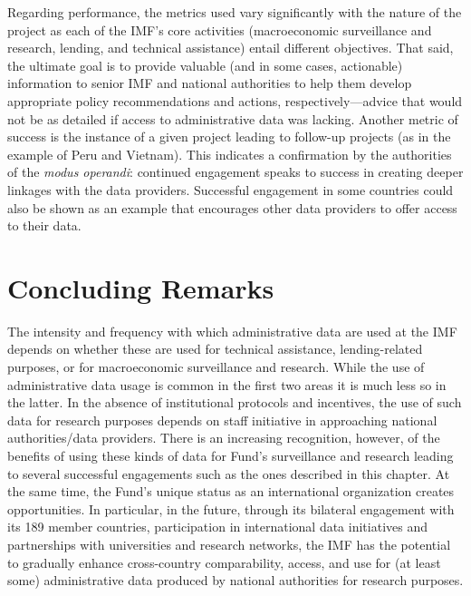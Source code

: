 Regarding performance, the metrics used vary significantly with the nature of the project as each of the IMF's core activities (macroeconomic surveillance and research, lending, and technical assistance) entail different objectives. That said, the ultimate goal is to provide valuable (and in some cases, actionable) information to senior IMF and national authorities to help them develop appropriate policy recommendations and actions, respectively---advice that would not be as detailed if access to administrative data was lacking. Another metric of success is the instance of a given project leading to follow-up projects (as in the example of Peru and Vietnam). This indicates a confirmation by the authorities of the \emph{modus operandi}: continued engagement speaks to success in creating deeper linkages with the data providers. Successful engagement in some countries could also be shown as an example that encourages other data providers to offer access to their data.

\hypertarget{concluding-remarks-4}{%
\section{Concluding Remarks}\label{concluding-remarks-4}}

The intensity and frequency with which administrative data are used at the IMF depends on whether these are used for technical assistance, lending-related purposes, or for macroeconomic surveillance and research. While the use of administrative data usage is common in the first two areas it is much less so in the latter. In the absence of institutional protocols and incentives, the use of such data for research purposes depends on staff initiative in approaching national authorities/data providers. There is an increasing recognition, however, of the benefits of using these kinds of data for Fund's surveillance and research leading to several successful engagements such as the ones described in this chapter. At the same time, the Fund's unique status as an international organization creates opportunities. In particular, in the future, through its bilateral engagement with its 189 member countries, participation in international data initiatives and partnerships with universities and research networks, the IMF has the potential to gradually enhance cross-country comparability, access, and use for (at least some) administrative data produced by national authorities for research purposes.

